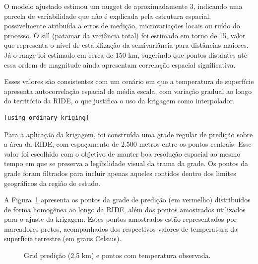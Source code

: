 \documentclass[
  letterpaper,
  DIV=11,
  numbers=noendperiod]{scrartcl}
\begin{document}
O modelo ajustado estimou um nugget de aproximadamente 3, indicando uma
parcela de variabilidade que não é explicada pela estrutura espacial,
possivelmente atribuída a erros de medição, microvariações locais ou
ruído do processo. O sill (patamar da variância total) foi estimado em
torno de 15, valor que representa o nível de estabilização da
semivariância para distâncias maiores. Já o range foi estimado em cerca
de 150 km, sugerindo que pontos distantes até essa ordem de magnitude
ainda apresentam correlação espacial significativa.

Esses valores são consistentes com um cenário em que a temperatura de
superfície apresenta autocorrelação espacial de média escala, com
variação gradual ao longo do território da RIDE, o que justifica o uso
da krigagem como interpolador.

\begin{verbatim}
[using ordinary kriging]
\end{verbatim}

Para a aplicação da krigagem, foi construída uma grade regular de
predição sobre a área da RIDE, com espaçamento de 2.500 metros entre os
pontos centrais. Esse valor foi escolhido com o objetivo de manter boa
resolução espacial ao mesmo tempo em que se preserva a legibilidade
visual da trama da grade. Os pontos da grade foram filtrados para
incluir apenas aqueles contidos dentro dos limites geográficos da região
de estudo.

A Figura~\ref{fig-grade-krigagem} apresenta os pontos da grade de
predição (em vermelho) distribuídos de forma homogênea ao longo da RIDE,
além dos pontos amostrados utilizados para o ajuste da krigagem. Estes
pontos amostrados estão representados por marcadores pretos,
acompanhados dos respectivos valores de temperatura da superfície
terrestre (em graus Celsius).

\label{cell-fig-grade-krigagem}
\begin{figure}[H]


\caption{\label{fig-grade-krigagem}Grid predição (2,5 km) e pontos com
temperatura observada.}

\end{figure}%
\end{document}
